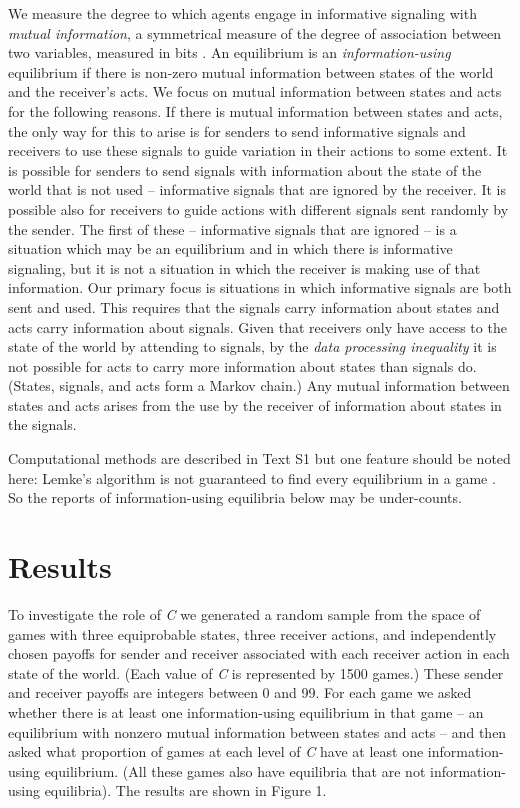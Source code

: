 \documentclass[10pt]{article}
\begin{document}
We measure the degree to which agents engage in informative signaling
with \emph{mutual information}, a symmetrical measure of the degree of
association between two variables, measured in bits \cite[p.~7]{Cover2006}. An equilibrium is an
\emph{information-using} equilibrium if there is non-zero mutual
information between states of the world and the receiver's acts. We
focus on mutual information between states and acts for the following
reasons. If there is mutual information between states and acts, the
only way for this to arise is for senders to send informative signals
and receivers to use these signals to guide variation in their actions
to some extent. It is possible for senders to send signals with
information about the state of the world that is not used -- informative
signals that are ignored by the receiver. It is possible also for
receivers to guide actions with different signals sent randomly by the
sender. The first of these -- informative signals that are ignored -- is
a situation which may be an equilibrium and in which there is
informative signaling, but it is not a situation in which the receiver
is making use of that information. Our primary focus is situations in
which informative signals are both sent and used. This requires that the
signals carry information about states and acts carry information about
signals. Given that receivers only have access to the state of the world
by attending to signals, by the \emph{data processing inequality} \cite[p.~34]{Cover2006}
it is not possible for acts to carry more information about states than
signals do. (States, signals, and acts form a Markov chain.) Any mutual
information between states and acts arises from the use by the receiver
of information about states in the signals.

Computational methods are described in Text S1 but
one feature should be noted here: Lemke's algorithm is not guaranteed to
find every equilibrium in a game \cite{Koller1996}. So the reports of
information-using equilibria below may be under-counts.

\section*{Results}

To investigate the role of \emph{C} we generated a random sample from
the space of games with three equiprobable states, three receiver
actions, and independently chosen payoffs for sender and receiver
associated with each receiver action in each state of the world. (Each
value of \emph{C} is represented by 1500 games.) These sender and
receiver payoffs are integers between 0 and 99. For each game we asked
whether there is at least one information-using equilibrium in that game
-- an equilibrium with nonzero mutual information between states and
acts -- and then asked what proportion of games at each level of
\emph{C} have at least one information-using equilibrium. (All these
games also have equilibria that are not information-using equilibria).
The results are shown in Figure 1.
\end{document}
